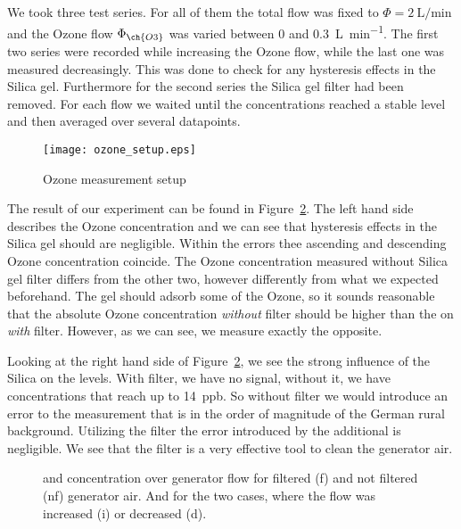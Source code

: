 We took three test series. For all of them the total flow was fixed to
$\Phi = \SI{2}{\liter\per\minute}$ and the Ozone flow $\Phi_{\ch{O3}}$
was varied between \num{0} and \SI{0.3}{\liter\per\minute}. The first
two series were recorded while increasing the Ozone flow, while the
last one was measured decreasingly. This was done to check for any
hysteresis effects in the Silica gel. Furthermore for the second
series the Silica gel filter had been removed. For each flow we waited
until the concentrations reached a stable level and then averaged over
several datapoints.

\begin{figure}[htbp]
  \centering
  \texttt{[image: ozone\_setup.eps]}
  \caption{Ozone measurement setup}
  \label{fig:ozone-flow-setup}
\end{figure}

The result of our experiment can be found in
Figure~\ref{fig:o3-flow}. The left hand side describes the Ozone
concentration and we can see that hysteresis effects in the Silica gel
should are negligible. Within the errors thee ascending and descending
Ozone concentration coincide. The Ozone concentration measured without
Silica gel filter differs from the other two, however differently from
what we expected beforehand. The gel should adsorb some of the Ozone,
so it sounds reasonable that the absolute Ozone concentration
\emph{without} filter should be higher than the on \emph{with}
filter. However, as we can see, we measure exactly the opposite. 

Looking at the right hand side of Figure~\ref{fig:o3-flow}, we see the
strong influence of the Silica on the  levels. With filter, we
have no  signal, without it, we have concentrations that reach
up to \SI{14}{ppb}. So without filter we would introduce an error to
the  measurement that is in the order of magnitude of the
German rural background. Utilizing the filter the error
introduced by the additional  is negligible. We see that the
filter is a very effective tool to clean the generator air.

\begin{figure}[htbp]
  \centering
  
  \hfill
  
  \caption{ and  concentration over generator flow for
    filtered (f) and not filtered (nf) generator air. And for the two
    cases, where the flow was increased (i) or decreased (d).}
  \label{fig:o3-flow}
\end{figure}

